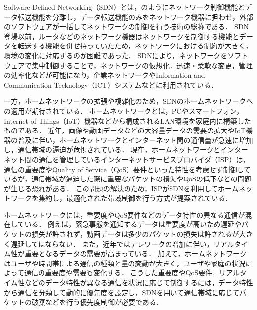 \documentclass[a4paper,11pt,uplatex]{ujreport}
\begin{document}
  Software-Defined Networking（SDN）とは，のようにネットワーク制御機能とデータ転送機能を分離し，データ転送機能のみをネットワーク機器に担わせ，外部のソフトウェアが一括してネットワークの制御を行う技術の総称である．
  SDN登場以前，ルータなどのネットワーク機器はネットワークを制御する機能とデータを転送する機能を併せ持っていたため，ネットワークにおける制約が大きく，環境の変化に対応するのが困難であった．
  SDNにより，ネットワークをソフトウェアで集中制御することで，ネットワークの仮想化，迅速・柔軟な変更，管理の効率化などが可能になり，企業ネットワークやInformation and Communication Tecknology（ICT）システムなどに利用されている\cite{NEC}．\par
  一方，ホームネットワークの拡張や複雑化のため，SDNのホームネットワークへの適用が期待されている．
  ホームネットワークとは，PCやスマートフォン，Internet of Things（IoT）機器などから構成されるLAN環境を家庭内に構築したものである．
  近年，画像や動画データなどの大容量データの需要の拡大やIoT機器の普及に伴い，ホームネットワークとインターネット間の通信量が急速に増加し，通信帯域の逼迫が危惧されている\cite{ガイドライン}．
  現在，ホームネットワークとインターネット間の通信を管理しているインターネットサービスプロバイダ（ISP）は，通信の重要度やQuality of Service（QoS）要件といった特性を考慮せず制御しているが，通信帯域が逼迫した際に重要なパケットの損失やQoSの低下などの問題が生じる恐れがある．
  この問題の解決のため，ISPがSDNを利用してホームネットワークを集約し，最適化された帯域制御を行う方式が提案されている\cite{Framework}．\par
  ホームネットワークには，重要度やQoS要件などのデータ特性の異なる通信が混在している．
  例えば，緊急事態を通知するデータは重要度が高いため遅延やパケットの損失が許されず，動画データは多少のパケットの損失は許されるが大きく遅延してはならない．
  また，近年ではテレワークの増加に伴い，リアルタイム性が重要となるデータの需要が高まっている．
  加えて，ホームネットワークはユーザや時間帯による通信の種類と量の変動が大きく，ユーザや家庭の状況によって通信の重要度や需要も変化する．
  こうした重要度やQoS要件，リアルタイム性などのデータ特性が異なる通信を状況に応じて制御するには，データ特性から通信を分類して動的に優先度を設定し，SDNを用いて通信帯域に応じてパケットの破棄などを行う優先度制御が必要である．
\end{document}
